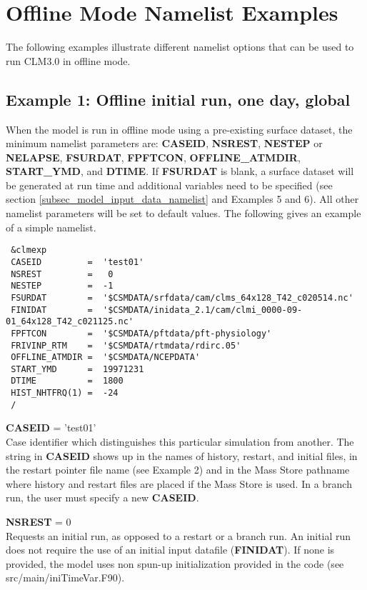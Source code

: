 \section {Offline Mode Namelist Examples}
\label{sec_examples}

The following examples illustrate different namelist options that 
can be used to run CLM3.0 in offline mode.

\subsection {Example 1: Offline initial run, one day, global}

When the model is run in offline mode using a pre-existing surface
dataset, the minimum namelist parameters are: {\bf CASEID}, {\bf
NSREST}, {\bf NESTEP} or {\bf NELAPSE}, {\bf FSURDAT}, {\bf FPFTCON},
{\bf OFFLINE\_ATMDIR}, {\bf START\_YMD}, and {\bf DTIME}. If {\bf
FSURDAT} is blank, a surface dataset will be generated at run time and
additional variables need to be specified (see section
\ref{subsec_model_input_data_namelist} and Examples 5 and 6).  All other
namelist parameters will be set to default values.  The following
gives an example of a simple namelist.

\begin{verbatim}
 &clmexp 
 CASEID         =  'test01'
 NSREST         =   0 
 NESTEP         =  -1 
 FSURDAT        =  '$CSMDATA/srfdata/cam/clms_64x128_T42_c020514.nc'
 FINIDAT        =  '$CSMDATA/inidata_2.1/cam/clmi_0000-09-01_64x128_T42_c021125.nc'
 FPFTCON        =  '$CSMDATA/pftdata/pft-physiology' 
 FRIVINP_RTM    =  '$CSMDATA/rtmdata/rdirc.05'
 OFFLINE_ATMDIR =  '$CSMDATA/NCEPDATA' 
 START_YMD      =  19971231
 DTIME          =  1800
 HIST_NHTFRQ(1) =  -24
 /
\end{verbatim}

\medskip \noindent 
{\bf CASEID} = 'test01' \\ Case identifier which distinguishes this
particular simulation from another. The string in {\bf CASEID} shows
up in the names of history, restart, and initial files, in the restart
pointer file name (see Example 2) and in the Mass Store pathname where
history and restart files are placed if the Mass Store is used.
In a branch run, the user must specify a new {\bf CASEID}.

\medskip \noindent 
{\bf NSREST} = 0 \\ Requests an initial run, as opposed to a restart
or a branch run. An initial run does not require the use of an initial
input datafile ({\bf FINIDAT}). If none is provided, the model uses
non spun-up initialization provided in the code (see
src/main/iniTimeVar.F90).

